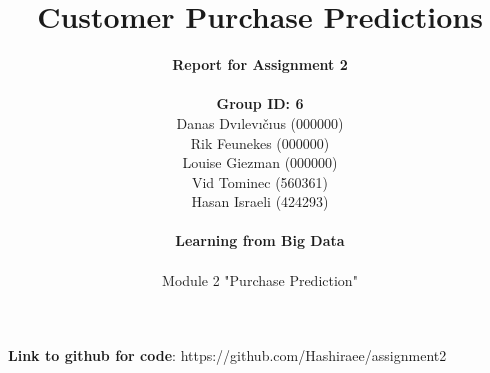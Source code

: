 \documentclass[11pt]{article}
\title{\textbf{Customer Purchase Predictions}}
\author{
    \textbf{Report for Assignment 2} \\
    \\
    \textbf{Group ID: 6} \\
    Danas Dvılevıčıus (000000) \\
    Rik Feunekes (000000) \\
    Louise Giezman (000000) \\
    Vid Tominec (560361) \\
    Hasan Israeli (424293) \\
    \\
    \textbf{Learning from Big Data} \\
    \\
    Module 2 "Purchase Prediction"
}
\begin{document}
\maketitle
\textbf{Link to github for code}: https://github.com/Hashiraee/assignment2
    \newpage
    
    
    
    
    
    \newpage
    
\end{document}
